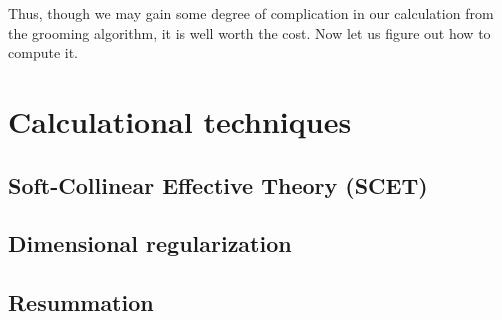 \documentclass[../thesis.tex]{subfiles}
\begin{document}
	Thus, though we may gain some degree of complication in our calculation from the grooming algorithm, it is well worth the cost. Now let us figure out how to compute it.


\section{Calculational techniques}
\subsection{Soft-Collinear Effective Theory (SCET)}

\subsection{Dimensional regularization}

\subsection{Resummation}
\end{document}
